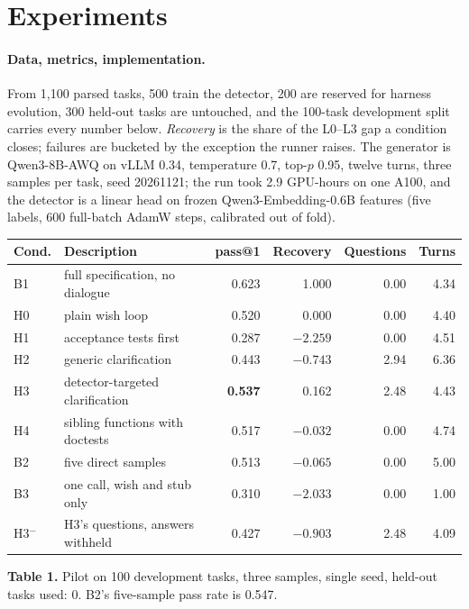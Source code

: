\documentclass{article}
\begin{document}
\section{Experiments}

\paragraph{Data, metrics, implementation.}
From 1{,}100 parsed tasks, 500 train the detector, 200 are reserved for harness evolution, 300
held-out tasks are untouched, and the 100-task development split carries every number below. \emph{Recovery} is the share of the L0--L3 gap a condition closes; failures are
bucketed by the exception the runner raises. The generator is Qwen3-8B-AWQ on vLLM 0.34,
temperature 0.7, top-$p$ 0.95, twelve turns, three samples per task, seed 20261121; the run took
2.9 GPU-hours on one A100, and the detector is a linear head on frozen Qwen3-Embedding-0.6B
features (five labels, 600 full-batch AdamW steps, calibrated out of fold).

\begin{center}
  \footnotesize
  \begin{tabular}{@{}llrrrr@{}}
    \toprule
    Cond. & Description & pass@1 & Recovery & Questions & Turns \\
    \midrule
    B1     & full specification, no dialogue  & 0.623 & 1.000 & 0.00 & 4.34 \\
    H0     & plain wish loop                  & 0.520 & 0.000 & 0.00 & 4.40 \\
    H1     & acceptance tests first           & 0.287 & $-2.259$ & 0.00 & 4.51 \\
    H2     & generic clarification            & 0.443 & $-0.743$ & 2.94 & 6.36 \\
    H3     & detector-targeted clarification  & \textbf{0.537} & 0.162 & 2.48 & 4.43 \\
    H4     & sibling functions with doctests  & 0.517 & $-0.032$ & 0.00 & 4.74 \\
    B2     & five direct samples              & 0.513 & $-0.065$ & 0.00 & 5.00 \\
    B3     & one call, wish and stub only     & 0.310 & $-2.033$ & 0.00 & 1.00 \\
    H3$^-$ & H3's questions, answers withheld & 0.427 & $-0.903$ & 2.48 & 4.09 \\
    \bottomrule
  \end{tabular}
  \vspace{2pt}

  {\footnotesize\raggedright\textbf{Table 1.} Pilot on 100 development tasks, three samples,
  single seed, held-out tasks used: 0. B2's five-sample pass rate is 0.547.\par}
\end{center}
\end{document}
